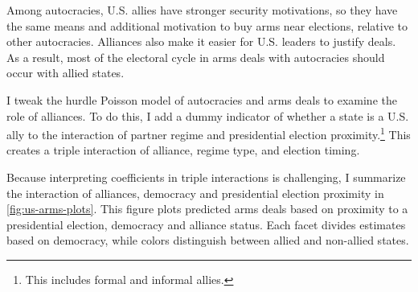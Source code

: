 \documentclass[12pt]{article}
\begin{document}




Among autocracies, U.S. allies have stronger security motivations, so they have the same means and additional motivation to buy arms near elections, relative to other autocracies. 
Alliances also make it easier for U.S. leaders to justify deals.
As a result, most of the electoral cycle in arms deals with autocracies should occur with allied states. 


I tweak the hurdle Poisson model of autocracies and arms deals to examine the role of alliances. 
To do this, I add a dummy indicator of whether a state is a U.S. ally to the interaction of partner regime and presidential election proximity.\footnote{This includes formal and informal allies.}
This creates a triple interaction of alliance, regime type, and election timing. 


Because interpreting coefficients in triple interactions is challenging, I summarize the interaction of alliances, democracy and presidential election proximity in \autoref{fig:us-arms-plots}.
This figure plots predicted arms deals based on proximity to a presidential election, democracy and alliance status. 
Each facet divides estimates based on democracy, while colors distinguish between allied and non-allied states. 
\end{document}
